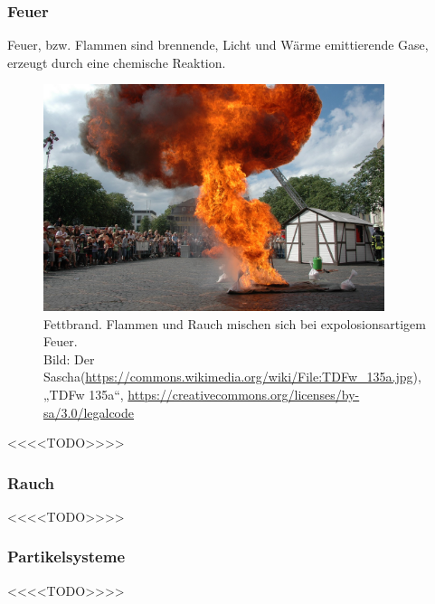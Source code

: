 \subsubsection{Feuer}
Feuer, bzw. Flammen sind brennende, Licht und Wärme emittierende Gase, erzeugt durch eine chemische Reaktion. 
\begin{figure}[h!]
	\includegraphics[width=0.89\textwidth]{Grafiken/Basics/Fire/Fettbrand.jpg}
	\centering
	\begin{footnotesize}
		\caption{Fettbrand. Flammen und Rauch mischen sich bei expolosionsartigem Feuer. \\Bild: Der Sascha(\url{https://commons.wikimedia.org/wiki/File:TDFw_135a.jpg}), „TDFw 135a“, \url{https://creativecommons.org/licenses/by-sa/3.0/legalcode}  }

		\label{fig:fettbrand}
	\end{footnotesize}
\end{figure}

<<<<TODO>>>>

\subsubsection{Rauch}
<<<<TODO>>>>

\subsubsection{Partikelsysteme}
<<<<TODO>>>>
